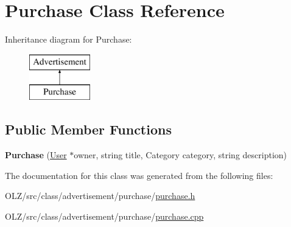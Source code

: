 \hypertarget{class_purchase}{}\section{Purchase Class Reference}
\label{class_purchase}
Inheritance diagram for Purchase\+:\begin{figure}[H]
\begin{center}
\leavevmode
\includegraphics[height=2.000000cm]{class_purchase}
\end{center}
\end{figure}
\subsection*{Public Member Functions}
\begin{DoxyCompactItemize}
\item 
\hypertarget{class_purchase_a5603b3428060205ce26e45441f37d560}{}{\bfseries Purchase} (\hyperlink{class_user}{User} $\ast$owner, string title, Category category, string description)\label{class_purchase_a5603b3428060205ce26e45441f37d560}

\end{DoxyCompactItemize}


The documentation for this class was generated from the following files\+:\begin{DoxyCompactItemize}
\item 
O\+L\+Z/src/class/advertisement/purchase/\hyperlink{purchase_8h}{purchase.\+h}\item 
O\+L\+Z/src/class/advertisement/purchase/\hyperlink{purchase_8cpp}{purchase.\+cpp}\end{DoxyCompactItemize}
